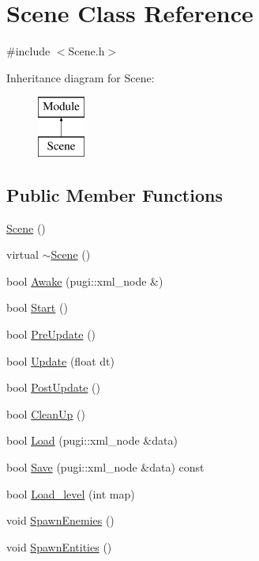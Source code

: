 \hypertarget{class_scene}{}\section{Scene Class Reference}
\label{class_scene}


{\ttfamily \#include $<$Scene.\+h$>$}

Inheritance diagram for Scene\+:\begin{figure}[H]
\begin{center}
\leavevmode
\includegraphics[height=2.000000cm]{class_scene}
\end{center}
\end{figure}
\subsection*{Public Member Functions}
\begin{DoxyCompactItemize}
\item 
\mbox{\hyperlink{class_scene_ad10176d75a9cc0da56626f682d083507}{Scene}} ()
\item 
virtual \mbox{\hyperlink{class_scene_a3b8cec2e32546713915f8c6303c951f1}{$\sim$\+Scene}} ()
\item 
bool \mbox{\hyperlink{class_scene_a03ed816e27ef7dced05082d214f554f1}{Awake}} (pugi\+::xml\+\_\+node \&)
\item 
bool \mbox{\hyperlink{class_scene_a4be9030f1269eb74266ea1067d07f56f}{Start}} ()
\item 
bool \mbox{\hyperlink{class_scene_aec633b956df0e05760f2274b5816d321}{Pre\+Update}} ()
\item 
bool \mbox{\hyperlink{class_scene_a3b7592b8a1ec0317edad4f694ea2d99c}{Update}} (float dt)
\item 
bool \mbox{\hyperlink{class_scene_a0e0ffba2fc23c7cb61242e99e59e4c68}{Post\+Update}} ()
\item 
bool \mbox{\hyperlink{class_scene_aac06490e9440c38b6970740a099ad14a}{Clean\+Up}} ()
\item 
bool \mbox{\hyperlink{class_scene_aabbd7af9c75ded5b555170426259699e}{Load}} (pugi\+::xml\+\_\+node \&data)
\item 
bool \mbox{\hyperlink{class_scene_a99b7629c7c9affe3fc2bd24a8c45bed4}{Save}} (pugi\+::xml\+\_\+node \&data) const
\item 
bool \mbox{\hyperlink{class_scene_ab4d0bc4653b2d48a8e7f403d29a8946f}{Load\+\_\+level}} (int map)
\item 
void \mbox{\hyperlink{class_scene_a6b3e2d3a301d43512f14cde45e52650f}{Spawn\+Enemies}} ()
\item 
void \mbox{\hyperlink{class_scene_a515150d1fcdc233358107bdb5ad23a66}{Spawn\+Entities}} ()
\end{DoxyCompactItemize}
